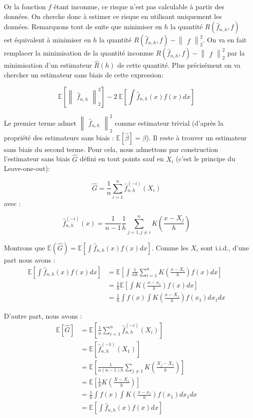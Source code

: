 \documentclass[
]{book}
\begin{document}
Or la fonction \(f\) étant inconnue, ce risque n'est pas calculable à partir des données. On cherche donc à estimer ce risque en utilisant uniquement les données. Remarquons tout de suite que minimiser en \(h\) la quantité \(R(\hat {f}_{n,h}, f)\) est équivalent à minimiser en \(h\) la quantité \(R(\hat {f}_{n,h}, f)-\begin{Vmatrix}f\end{Vmatrix}_2^2\). On va en fait remplacer la minimisation de la quantité inconnue \(R(\hat {f}_{n,h}, f)-\begin{Vmatrix}f\end{Vmatrix}_2^2\) par la minimisation d'un estimateur \(\hat {R}(h)\) de cette quantité. Plus précisément on va chercher un estimateur sans biais de cette expression:

\[
\mathbb{E}[\begin{Vmatrix}\hat {f}_{n,h}\end{Vmatrix}_2^2] -2~\mathbb{E}[\int \hat {f}_{n,h}(x)f(x)dx]
\]

Le premier terme admet \(\begin{Vmatrix}\hat {f}_{n,h}\end{Vmatrix}_2^2\) comme estimateur trivial (d'après la propriété des estimateurs sans biais : \(\mathbb{E}[\hat {\beta}]=\beta\)).\newline
Il reste à trouver un estimateur sans biais du second terme. Pour cela, nous admettons par construction l'estimateur sans biais \(\hat {G}\) défini en tout points sauf en \(X_i\) (c'est le principe du Leave-one-out):

\[
\hat{G} = \frac{1}{n}\sum_{i=1}^n\hat {f}_{n,h}^{(-i)}(X_i)
\]
avec :

\[
  \hat {f}_{n,h}^{(-i)}(x)= \frac{1}{n-1}\frac{1}{h}\sum_{j=1,j\ne i}^nK(\frac{x-X_j}{h})
\]

Montrons que \(\mathbb{E}(\hat{G})=\mathbb{E}[\int \hat{f}_{n,h}(x)f(x)dx]\).\newline
Comme les \(X_i\) sont i.i.d., d'une part nous avons :
\[
\begin{aligned}
\mathbb{E}[\int \hat {f}_{n,h}(x)f(x)dx]&= \mathbb{E}[\int \frac {1}{nh}\sum_{i=1}^nK(\frac {x-X_i}{h})f(x)dx]\\
&=\frac{1}{h}\mathbb{E}[\int K(\frac {x-x_1}{h})f(x)dx] \\
&=\frac{1}{h}\int f(x)\int K(\frac {x-X_1}{h})f(x_1)dx_1dx
\end{aligned}
\]

D'autre part, nous avons :
\[ 
\begin{aligned}
\mathbb{E}[\hat{G}]&=\mathbb{E}[\frac{1}{n}\sum_{i=1}^n\hat{f}_{n,h}^{(-i)}(X_i)]\\
&=\mathbb{E}[\hat{f}_{n,h}^{(-1)}(X_1)]\\
&=\mathbb{E}[\frac{1}{n(n-1)h}\sum_{j\ne 1}K(\frac{X_j-X_1}{h})]\\
&=\mathbb{E}[\frac{1}{h}K(\frac{X-X_1}{h})]\\
&=\frac{1}{h}\int f(x)\int K(\frac{x-x_1}{h})f(x_1)dx_1dx\\
&=\mathbb{E}[\int \hat{f}_{n,h}(x)f(x)dx] 
\end{aligned}
\]
\end{document}
